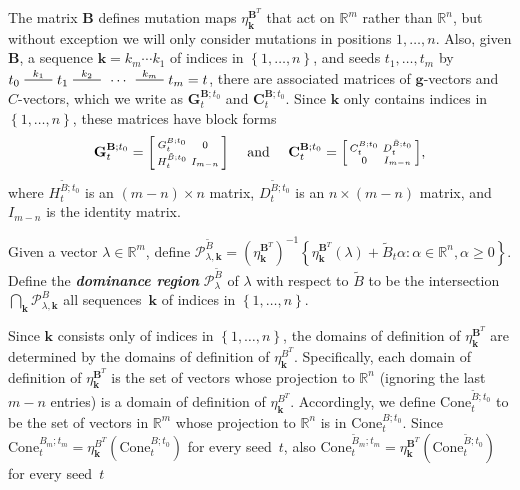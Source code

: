 \documentclass{amsart}
\theoremstyle{definition}
\theoremstyle{remark}
\numberwithin{equation}{section}
\newcommand{\newword}[1]{\textbf{\emph{#1}}}
\newcommand{\reals}{\mathbb R}
\newcommand{\edge}{\,\,\rule[2.7pt]{20pt}{0.5pt}\,\,}
\newcommand{\set}[1]{{\left\lbrace #1 \right\rbrace}}
\newcommand{\GG}{{\mathbf G}}
\newcommand{\CC}{{\mathbf C}}
\newcommand{\0}{{\mathbf{0}}}
\newcommand{\Cone}{\mathrm{Cone}}
\newcommand{\g}{\mathbf{g}}
\newcommand{\kk}{\mathbf{k}}
\newcommand{\tB}{{\tilde{B}}}
\newcommand{\BB}{\mathbf{B}}
\renewcommand{\H}{\mathcal{H}}
\renewcommand{\P}{\mathcal{P}}
\begin{document}
The matrix $\BB$ defines mutation maps $\eta_\kk^{\BB^T}$ that act on $\reals^m$ rather than $\reals^n$, but without exception we will only consider mutations in positions $1,\ldots,n$.
Also, given $\BB$, a sequence $\kk=k_m\cdots k_1$ of indices in $\set{1,\ldots,n}$, and seeds $t_1,\ldots,t_m$ by $t_0\overset{k_1}{\edge}t_1\overset{k_2}{\edge}\,\cdots\,\overset{k_m}{\edge}t_m=t$, there are associated matrices of $\g$-vectors and $C$-vectors, which we write as $\GG_t^{\BB;t_0}$ and $\CC_t^{\BB;t_0}$.
Since $\kk$ only contains indices in $\set{1,\ldots,n}$, these matrices have block forms
\[
\GG_t^{\BB;t_0}=\begin{bsmallmatrix}G_t^{B;t_0}&0\\H_t^{\tB;t_0}&I_{m-n}\end{bsmallmatrix}
\quad\text{ and }\quad
\CC_t^{\BB;t_0}=\begin{bsmallmatrix}C_t^{B;t_0}&D_t^{\tB;t_0}\\0&I_{m-n}\end{bsmallmatrix},
\]
where $H_t^{\tB;t_0}$ is an $(m-n)\times n$ matrix, $D_t^{\tB;t_0}$ is an $n\times(m-n)$ matrix, and $I_{m-n}$ is the identity matrix.

Given a vector $\lambda\in\reals^m$, define $\P^\tB_{\lambda,\kk}=\left(\eta_{\kk}^{\BB^T}\right)^{-1}\!\!\set{\eta_\kk^{\BB^T}(\lambda)+\tB_t\alpha:\alpha\in\reals^n,\alpha\ge0}$.
Define the \newword{dominance region} $\P^\tB_\lambda$ of $\lambda$ with respect to $\tB$ to be the intersection $\bigcap_\kk\P^B_{\lambda,\kk}$ all sequences~$\kk$ of indices in $\set{1,\ldots,n}$.

Since $\kk$ consists only of indices in $\set{1,\ldots,n}$, the domains of definition of $\eta_\kk^{\BB^T}$ are determined by the domains of definition of $\eta_\kk^{B^T}$.
Specifically, each domain of definition of $\eta_\kk^{\BB^T}$ is the set of vectors whose projection to $\reals^n$ (ignoring the last $m-n$ entries) is a domain of definition of $\eta_\kk^{B^T}$.
Accordingly, we define $\Cone_t^{\tB;t_0}$ to be %
the set of vectors in $\reals^m$ whose projection to $\reals^n$ is in $\Cone_t^{B;t_0}$.
Since $\Cone_t^{B_m;t_m}=\eta_\kk^{B^T}\left(\Cone_t^{B;t_0}\right)$ for every seed~$t$, also $\Cone_t^{\tB_m;t_m}=\eta_\kk^{\BB^T}\left(\Cone_t^{\tB;t_0}\right)$ for every seed~$t$
\end{document}
